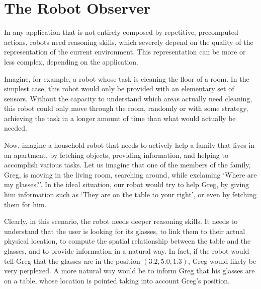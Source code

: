 \part{The Robot Observer} %
\label{part:robot_observer} %



In any application that is not entirely composed by repetitive, precomputed actions, robots need reasoning skills, which severely depend on the quality of the representation of the current environment. This representation can be more or less complex, depending on the application. 

Imagine, for example, a robot whose task is cleaning the floor of a room. In the simplest case, this robot would only be provided with an elementary set of sensors. Without the capacity to understand which areas actually need cleaning, this robot could only move through the room, randomly or with some strategy, achieving the task in a longer amount of time than what would actually be needed. 


Now, imagine a household robot that needs to actively help a family that lives in an apartment, by fetching objects, providing information, and helping to accomplish various tasks. Let us imagine that one of the members of the family, Greg, is moving in the living room, searching around, while exclaming `Where are my glasses?'. In the ideal situation, our robot would try to help Greg, by giving him information such as `They are on the table to your right', or even by fetching them for him. 

Clearly, in this scenario, the robot needs deeper reasoning skills. It needs to understand that the user is looking for its glasses, to link them to their actual physical location, to compute the spatial relationship between the table and the glasses, and to provide information in a natural way. In fact, if the robot would tell Greg that the glasses are in the position $(3.2, 5.0 , 1.3)$, Greg would likely be very perplexed. A more natural way would be to inform Greg that his glasses are on a table, whose location is pointed taking into account Greg's position.

